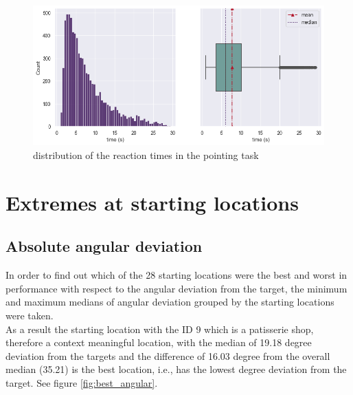 \begin{figure}[h]
	\centering
	\includegraphics[width=150mm]{figures/RT_hist_box_23.png}
	\caption[Distribution of reaction times]{distribution of the  reaction times in the pointing task}
	\label{fig:rt_dists}
\end{figure}

\section{Extremes at starting locations}

\subsection{Absolute angular deviation}

In order to find out which of the 28 starting locations were the best and worst in performance with respect to the angular deviation from the target, the minimum and maximum medians of angular deviation grouped by the starting locations were taken.\\
As a result the starting location with the ID 9 which is a patisserie shop, therefore a context meaningful location, with the median of 19.18 degree deviation from the targets and the difference of 16.03 degree from the overall median (35.21) is the best location, i.e., has the lowest degree deviation from the target. See figure \ref{fig:best_angular}.\\


